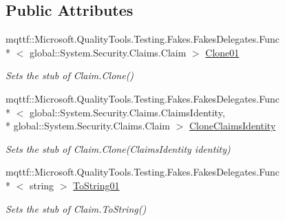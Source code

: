 \subsection*{Public Attributes}
\begin{DoxyCompactItemize}
\item 
mqttf\-::\-Microsoft.\-Quality\-Tools.\-Testing.\-Fakes.\-Fakes\-Delegates.\-Func\\*
$<$ global\-::\-System.\-Security.\-Claims.\-Claim $>$ \hyperlink{class_system_1_1_security_1_1_claims_1_1_fakes_1_1_stub_claim_a38ec05209060a1dd6710a0c9b2a1487b}{Clone01}
\begin{DoxyCompactList}\small\item\em Sets the stub of Claim.\-Clone()\end{DoxyCompactList}\item 
mqttf\-::\-Microsoft.\-Quality\-Tools.\-Testing.\-Fakes.\-Fakes\-Delegates.\-Func\\*
$<$ global\-::\-System.\-Security.\-Claims.\-Claims\-Identity, \\*
global\-::\-System.\-Security.\-Claims.\-Claim $>$ \hyperlink{class_system_1_1_security_1_1_claims_1_1_fakes_1_1_stub_claim_ace1a120885856c4767aecd6ae75a1099}{Clone\-Claims\-Identity}
\begin{DoxyCompactList}\small\item\em Sets the stub of Claim.\-Clone(\-Claims\-Identity identity)\end{DoxyCompactList}\item 
mqttf\-::\-Microsoft.\-Quality\-Tools.\-Testing.\-Fakes.\-Fakes\-Delegates.\-Func\\*
$<$ string $>$ \hyperlink{class_system_1_1_security_1_1_claims_1_1_fakes_1_1_stub_claim_aa7b627ad2b53c4271bd54353a9309c10}{To\-String01}
\begin{DoxyCompactList}\small\item\em Sets the stub of Claim.\-To\-String()\end{DoxyCompactList}\end{DoxyCompactItemize}
